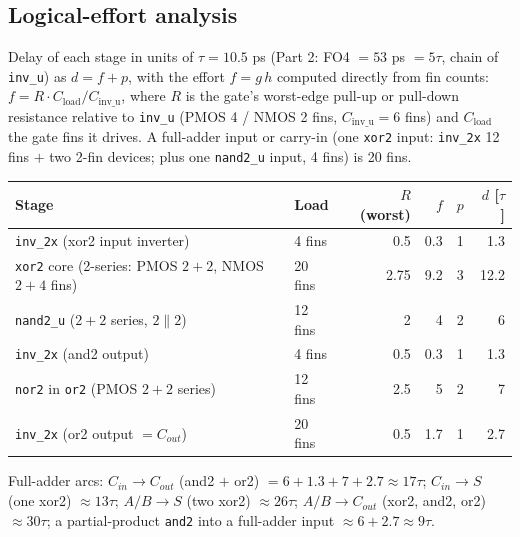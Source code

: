 \documentclass[10pt,letterpaper]{article}
\newcommand{\code}[1]{\texttt{#1}}
\begin{document}
\subsection{Logical-effort analysis}\label{sec:le}
Delay of each stage in units of $\tau=10.5$ ps (Part 2: FO4 $=53$ ps $=5\tau$, chain of \code{inv\_u}) as $d=f+p$, with the effort $f=g\,h$ computed directly from fin counts: $f=R\cdot C_{\text{load}}/C_{\text{inv\_u}}$, where $R$ is the gate's worst-edge pull-up or pull-down resistance relative to \code{inv\_u} (PMOS 4 / NMOS 2 fins, $C_{\text{inv\_u}}=6$ fins) and $C_{\text{load}}$ the gate fins it drives. A full-adder input or carry-in (one \code{xor2} input: \code{inv\_2x} 12 fins $+$ two 2-fin devices; plus one \code{nand2\_u} input, 4 fins) is 20 fins.
\begin{center}\small\begin{tabularx}{\linewidth}{@{}L l r r r r@{}}\toprule Stage & Load & $R$ (worst) & $f$ & $p$ & $d$ [$\tau$]\\\midrule
\code{inv\_2x} (xor2 input inverter) & 4 fins & 0.5 & 0.3 & 1 & 1.3\\\addlinespace
\code{xor2} core (2-series: PMOS $2{+}2$, NMOS $2{+}4$ fins) & 20 fins & 2.75 & 9.2 & 3 & 12.2\\\addlinespace
\code{nand2\_u} ($2{+}2$ series, $2\parallel2$) & 12 fins & 2 & 4 & 2 & 6\\\addlinespace
\code{inv\_2x} (and2 output) & 4 fins & 0.5 & 0.3 & 1 & 1.3\\\addlinespace
\code{nor2} in \code{or2} (PMOS $2{+}2$ series) & 12 fins & 2.5 & 5 & 2 & 7\\\addlinespace
\code{inv\_2x} (or2 output $=C_{out}$) & 20 fins & 0.5 & 1.7 & 1 & 2.7\\\bottomrule\end{tabularx}\end{center}
Full-adder arcs: $C_{in}\to C_{out}$ (and2 $+$ or2) $=6+1.3+7+2.7\approx17\tau$; $C_{in}\to S$ (one xor2) $\approx13\tau$; $A/B\to S$ (two xor2) $\approx26\tau$; $A/B\to C_{out}$ (xor2, and2, or2) $\approx30\tau$; a partial-product \code{and2} into a full-adder input $\approx6+2.7\approx9\tau$.
\end{document}
